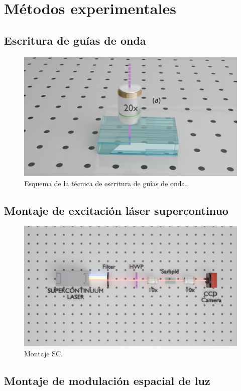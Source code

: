 \chapter{Métodos experimentales}

\section{Escritura de guías de onda \label{cap:fs}}
\begin{figure}[H]
	\centering
	\includegraphics[width=0.6\linewidth, trim={18cm 4cm 15cm 6cm},clip]{media/fabrication}
	\caption{Esquema de la técnica de escritura de guías de onda.}
\end{figure}

\section{Montaje de excitación láser supercontinuo}
\begin{figure}[H]
	\centering
	\includegraphics[width=\linewidth, trim={5cm 9cm 3cm 7cm},clip]{media/SC_setup}
	\caption{Montaje SC.}
\end{figure}

\section{Montaje de modulación espacial de luz}

